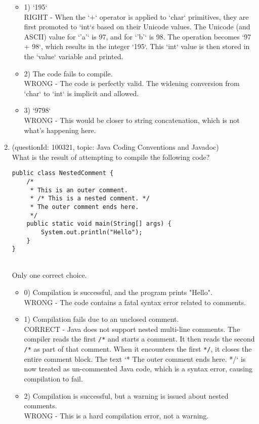 \documentclass[12pt]{article}
\begin{document}
\begin{enumerate}[label=(\arabic*)]
\begin{itemize}
\item 1) `195`
 \\ 
RIGHT - When the `+` operator is applied to `char` primitives, they are first promoted to `int`s based on their Unicode values. The Unicode (and ASCII) value for `'a'` is 97, and for `'b'` is 98. The operation becomes `97 + 98`, which results in the integer `195`. This `int` value is then stored in the `value` variable and printed.

\item 2) The code fails to compile.
 \\ 
WRONG - The code is perfectly valid. The widening conversion from `char` to `int` is implicit and allowed.

\item 3) `9798`
 \\ 
WRONG - This would be closer to string concatenation, which is not what's happening here.

\end{itemize}
\item (questionId: 100321, topic: Java Coding Conventions and Javadoc) \\ 
What is the result of attempting to compile the following code?
\begin{verbatim}
public class NestedComment {
    /*
     * This is an outer comment.
     * /* This is a nested comment. */
     * The outer comment ends here.
     */
    public static void main(String[] args) {
        System.out.println("Hello");
    }
}
\end{verbatim}
\\ \noindent Only one correct choice. 
\begin{itemize}
\item 0) Compilation is successful, and the program prints "Hello".
 \\ 
WRONG - The code contains a fatal syntax error related to comments.

\item 1) Compilation fails due to an unclosed comment.
 \\ 
CORRECT - Java does not support nested multi-line comments. The compiler reads the first \verb|/*| and starts a comment. It then reads the second \verb|/*| as part of that comment. When it encounters the first \verb|*/|, it closes the entire comment block. The text `* The outer comment ends here. */` is now treated as un-commented Java code, which is a syntax error, causing compilation to fail.

\item 2) Compilation is successful, but a warning is issued about nested comments.
 \\ 
WRONG - This is a hard compilation error, not a warning.


\end{itemize}
\end{enumerate}
\end{document}
